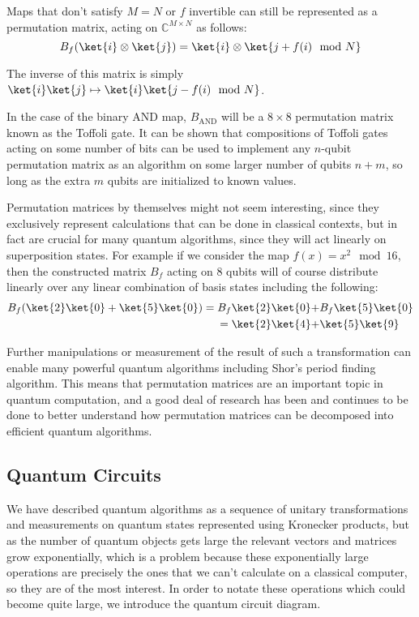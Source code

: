 Maps that don't satisfy $M = N$ or $f$ invertible can still be represented as a permutation matrix, acting on $\mathbb{C}^{M\times N}$ as follows:
\[B_f(\ket{i}\otimes\ket{j}) = \ket{i}\otimes\ket{j+f(i) \mod N}\]

The inverse of this matrix is simply $\ket{i}\ket{j} \mapsto \ket{i}\ket{j-f(i) \mod N}$.

In the case of the binary AND map, $B_{\text{AND}}$ will be a $8\times8$ permutation matrix known as the Toffoli gate. It can be shown that compositions of Toffoli gates acting on some number of bits can be used to implement any $n$-qubit permutation matrix as an algorithm on some larger number of qubits $n+m$, so long as the extra $m$ qubits are initialized to known values.

Permutation matrices by themselves might not seem interesting, since they exclusively represent calculations that can be done in classical contexts, but in fact are crucial for many quantum algorithms, since they will act linearly on superposition states. For example if we consider the map $f(x) = x^2\mod 16$, then the constructed matrix $B_f$ acting on 8 qubits will of course distribute linearly over any linear combination of basis states including the following:
\begin{align*}
	B_f(\ket{2}\ket{0}+\ket{5}\ket{0}) 
	= B_f\ket{2}\ket{0} +& B_f\ket{5}\ket{0}
	\\= \ket{2}\ket{4} +& \ket{5}\ket{9}
\end{align*}

Further manipulations or measurement of the result of such a transformation can enable many powerful quantum algorithms including Shor's period finding algorithm. This means that permutation matrices are an important topic in quantum computation, and a good deal of research has been and continues to be done to better understand how permutation matrices can be decomposed into efficient quantum algorithms.

\subsection{Quantum Circuits}
We have described quantum algorithms as a sequence of unitary transformations and measurements on quantum states represented using Kronecker products, but as the number of quantum objects gets large the relevant vectors and matrices grow exponentially, which is a problem because these exponentially large operations are precisely the ones that we can't calculate on a classical computer, so they are of the most interest. In order to notate these operations which could become quite large, we introduce the quantum circuit diagram.

